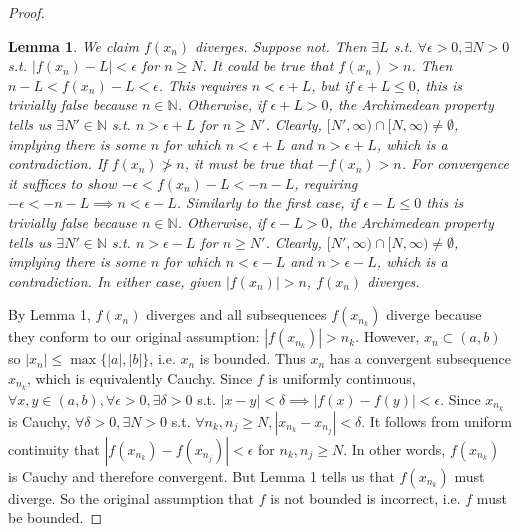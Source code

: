 \documentclass{article}
\newtheorem{lemma}[theorem]{Lemma}
\begin{document}
\begin{enumerate}
\begin{proof}
      \begin{lemma}
        We claim $f(x_n)$ diverges. Suppose not.
        Then $\exists L$ s.t. $\forall \epsilon > 0, \exists N > 0$
        s.t. $|f(x_n) - L| < \epsilon$ for $n \geq N$.
        It could be true that $f(x_n) > n$.
        Then $n - L < f(x_n) - L < \epsilon$.
        This requires $n < \epsilon + L$, but if $\epsilon + L \leq 0$,
        this is trivially false because $n \in \mathbb{N}$. Otherwise, if $\epsilon + L > 0$,
        the Archimedean property tells us $\exists N' \in \mathbb{N}$
        s.t. $n > \epsilon + L$ for $n \geq N'$. Clearly, $[N', \infty) \cap [N, \infty) \neq \emptyset$,
        implying there is some $n$ for which $n < \epsilon + L$ and $n > \epsilon + L$, 
        which is a contradiction. If $f(x_n) \not> n$, it must be true
        that $-f(x_n) > n$. For convergence it suffices to show $-\epsilon < f(x_n) - L < -n - L$,
        requiring $-\epsilon < -n - L \implies n < \epsilon - L$. Similarly to 
        the first case, if $\epsilon - L \leq 0$ this is trivially false because $n \in \mathbb{N}$.
        Otherwise, if $\epsilon - L > 0$, the Archimedean property tells us $\exists N' \in \mathbb{N}$
        s.t. $n > \epsilon - L$ for $n \geq N'$. Clearly, $[N', \infty) \cap [N, \infty) \neq \emptyset$,
        implying there is some $n$ for which $n < \epsilon - L$ and $n > \epsilon - L$, 
        which is a contradiction. In either case, given $|f(x_n)| > n$, $f(x_n)$ diverges.
      \end{lemma}
      By Lemma 1, $f(x_n)$ diverges and all subsequences $f(x_{n_k})$ diverge
      because they conform to our original assumption: $|f(x_{n_k})| > n_k$. However, $x_n\subset (a, b)$ so $|x_n| \leq \max\{|a|, |b|\}$,
      i.e. $x_n$ is bounded. Thus $x_n$ has a convergent subsequence $x_{n_k}$, which is equivalently Cauchy. Since $f$ is 
      uniformly continuous, $\forall x, y\in (a,b), \forall \epsilon > 0, \exists \delta > 0$ s.t. $|x-y|<\delta \implies|f(x)-f(y)|<\epsilon$.
      Since $x_{n_k}$ is Cauchy, $\forall \delta > 0, \exists N>0$ s.t. $\forall n_k, n_j \geq N, |x_{n_k} - x_{n_j}| < \delta$.
      It follows from uniform continuity that $|f(x_{n_k}) - f(x_{n_j})| < \epsilon$ for $n_k, n_j \geq N$. In other words,
      $f(x_{n_k})$ is Cauchy and therefore convergent. But Lemma 1 tells us that $f(x_{n_k})$ must diverge.
      So the original assumption that $f$ is not bounded is incorrect, i.e. $f$ must be bounded.

    \end{proof}


\end{enumerate}
\end{document}
